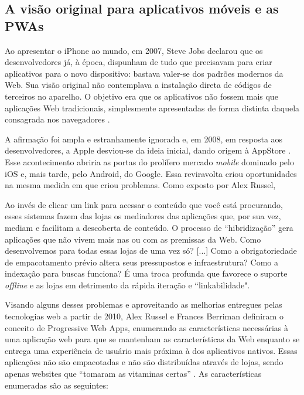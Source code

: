 \documentclass[
	article,			%
	11pt,				%
	oneside,			%
	a4paper,			%
	english,			%
	brazil,				%
	sumario=tradicional
	]{abntex2}
\begin{document}
\subsection{A visão original para aplicativos móveis e as PWAs}

Ao apresentar o iPhone ao mundo, em 2007, Steve Jobs declarou que os desenvolvedores  já, à época,  dispunham de tudo que precisavam para criar aplicativos para o novo dispositivo: bastava valer-se dos padrões modernos da Web. Sua visão original não contemplava a instalação direta de códigos de terceiros no aparelho. O objetivo era que os aplicativos não fossem mais que aplicações Web tradicionais, simplesmente apresentadas de forma distinta daquela consagrada nos navegadores \cite{9to5-2011}.

A afirmação foi ampla e estranhamente ignorada e, em 2008, em resposta aos desenvolvedores, a Apple desviou-se da ideia inicial, dando origem à AppStore \cite{9to5-2011}. Esse acontecimento abriria as portas do prolífero mercado \textit{mobile} dominado pelo iOS e, mais tarde, pelo Android, do Google. Essa reviravolta criou oportunidades na mesma medida em que criou problemas. Como exposto por Alex Russel,

\begin{citacao}
Ao invés de clicar um link para acessar o conteúdo que você está procurando, esses sistemas fazem das lojas os mediadores das aplicações que, por sua vez, mediam e facilitam a descoberta de conteúdo. O processo de “hibridização” gera aplicações que não vivem mais nas ou com as premissas da Web. Como desenvolvemos para todas essas lojas de uma vez só? [...] Como a obrigatoriedade de empacotamento prévio altera seus pressupostos e infraestrutura? Como a indexação para buscas funciona? É uma troca profunda que favorece o suporte \textit{offline} e as lojas em detrimento da rápida iteração e “linkabilidade". \cite[tradução nossa]{russel-2015}
\end{citacao}

Visando alguns desses problemas e aproveitando as melhorias entregues pelas tecnologias web a partir de 2010, Alex Russel e Frances Berriman definiram o conceito de Progressive Web Apps, enumerando as características necessárias à uma aplicação web para que se mantenham as características da Web enquanto se entrega uma experiência de usuário mais próxima à dos aplicativos nativos. Essas aplicações não são empacotadas e não são distribuídas através de lojas, sendo apenas websites que “tomaram as vitaminas certas” \cite{russel-2015}. As características enumeradas são as seguintes:
\end{document}
